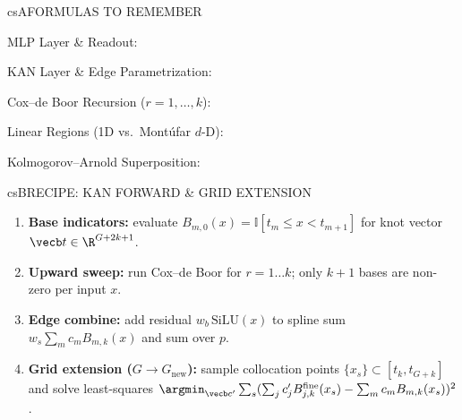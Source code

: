 \documentclass[../../../../master.tex]{subfiles}
\begin{document}
\begin{cscolumns}
\begin{cscard}{csA}{FORMULAS TO REMEMBER}
  \begin{csbul}
    \item MLP Layer \& Readout:
    \item KAN Layer \& Edge Parametrization:
    \item Cox--de Boor Recursion ($r=1,\dots,k$):
    \item Linear Regions (1D vs.\ Mont\'ufar $d$-D):
    \item Kolmogorov--Arnold Superposition:
  \end{csbul}
\end{cscard}

\begin{cscard}{csB}{RECIPE: KAN FORWARD \& GRID EXTENSION}
  \begin{enumerate}[leftmargin=1.2em, itemsep=1pt, topsep=1pt, parsep=0pt]
    \item \textbf{Base indicators:} evaluate $B_{m,0}(x)=\mathbb{I}[t_m\le x<t_{m+1}]$ for knot vector $\vecb t\in\R^{G+2k+1}$.
    \item \textbf{Upward sweep:} run Cox--de Boor for $r=1\dots k$; only $k{+}1$ bases are non-zero per input $x$.
    \item \textbf{Edge combine:} add residual $w_b\,\mathrm{SiLU}(x)$ to spline sum $w_s\sum_m c_m B_{m,k}(x)$ and sum over $p$.
    \item \textbf{Grid extension ($G\to G_{\text{new}}$):} sample collocation points $\{x_s\}\subset[t_k,t_{G+k}]$ and solve least-squares $\argmin_{\vecb c'}\sum_s(\sum_j c'_j B_{j,k}^{\text{fine}}(x_s)-\sum_m c_m B_{m,k}(x_s))^2$.
  \end{enumerate}
\end{cscard}
\columnbreak


\end{cscolumns}
\end{document}
